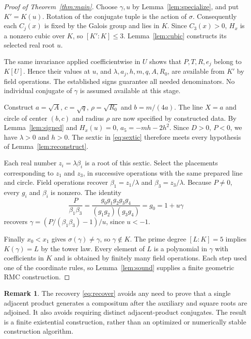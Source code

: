\documentclass[noproofs]{rmj-public}
\theoremstyle{definition}
\newtheorem{remark}[thm]{Remark}
\numberwithin{equation}{section}
\begin{document}
\begin{proof}[Proof of Theorem~\ref{thm:main}]
Choose $\gamma,u$ by Lemma~\ref{lem:specialize}, and put
$K'=K(u)$. Rotation of the conjugate tuple is the action of $\sigma$.
Consequently each $C_j(x)$ is fixed by the Galois group and lies in $K$.
Since $C_3(x)>0$, $H_x$ is a nonzero cubic over $K$, so $[K':K]\le3$.
Lemma~\ref{lem:cubic} constructs its selected real root $u$.

The same invariance applied coefficientwise in $U$ shows that
$P,T,R,e_j$ belong to $K[U]$. Hence their values at $u$, and
$\lambda,a_j,h,m,q,A,R_0$, are available from $K'$ by field operations.
The established signs guarantee all needed denominators. No individual
conjugate of $\gamma$ is assumed available at this stage.

Construct $a=\sqrt A$, $c=\sqrt q$, $\rho=\sqrt{R_0}$ and $b=m/(4a)$.
The line $X=a$ and circle of center $(b,c)$ and radius $\rho$ are now
specified by constructed data. By Lemma~\ref{lem:signed} and $H_x(u)=0$,
$a_5=-mh-2h^2$. Since $D>0$, $P<0$, we have $\lambda>0$ and $h>0$.
The sextic in \eqref{eq:sextic} therefore meets every hypothesis of
Lemma~\ref{lem:reconstruct}.

Each real number $z_i=\lambda\beta_i$ is a root of this sextic.
Select the placements corresponding to $z_1$ and $z_3$, in successive
operations with the same prepared line and circle. Field operations
recover $\beta_1=z_1/\lambda$ and $\beta_3=z_3/\lambda$. Because
$P\ne0$, every $g_i$ and $\beta_i$ is nonzero. The identity
\begin{equation}\label{eq:recover}
\frac P{\beta_1\beta_3}
=\frac{g_0g_1g_2g_3g_4}{(g_1g_2)(g_3g_4)}
=g_0=1+u\gamma
\end{equation}
recovers $\gamma=(P/(\beta_1\beta_3)-1)/u$, since $u<-1$.

Finally $x_0<x_1$ gives $\sigma(\gamma)\ne\gamma$, so $\gamma\notin K$.
The prime degree $[L:K]=5$ implies $K(\gamma)=L$ by the tower law.
Every element of $L$ is a polynomial in $\gamma$ with coefficients in
$K$ and is obtained by finitely many field operations. Each step used
one of the coordinate rules, so Lemma~\ref{lem:sound} supplies a finite
geometric RMC construction.
\end{proof}

\begin{remark}
The recovery \eqref{eq:recover} avoids any need to prove that a single
adjacent product generates a compositum after the auxiliary and square
roots are adjoined. It also avoids requiring distinct adjacent-product
conjugates. The result is a finite existential construction, rather than
an optimized or numerically stable construction algorithm.
\end{remark}
\end{document}
